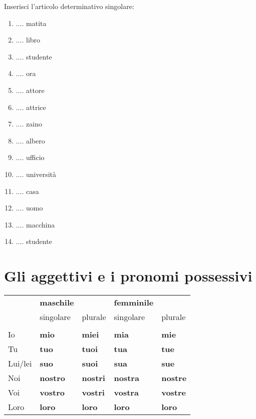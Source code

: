 \documentclass[letter,11pt]{article}
\newcommand{\myCode}[1]{\colorbox{gray!30}{#1}}
\begin{document}
\vskip 0.5in
\myCode{Inserisci l'articolo determinativo singolare: }

\begin{multicols}{2}
\begin{enumerate}
    \item .... matita
    \item .... libro
    \item .... studente
    \item .... ora
    \item .... attore
    \item .... attrice
    \item .... zaino
    \item .... albero
    \item .... ufficio
    \item .... università
    \item .... casa
    \item .... uomo
    \item .... macchina
    \item .... studente
\end{enumerate}
\end{multicols}

\vskip 0.5in
\section*{Gli aggettivi e i pronomi possessivi}

\vskip 0.2in

\begin{tabular}{ |p{3cm}| p{2cm}| p{2cm}| p{2cm}| p{2cm}| }
    & {\bf maschile} & & {\bf femminile} &  \\
    & singolare & plurale & singolare & plurale  \\
    \hline
    \hline
    & & & & \\ \hline
    Io   &  {\bf mio} & {\bf miei} & {\bf mia} & {\bf mie}  \\ \hline
    Tu   &  {\bf tuo} & {\bf tuoi} & {\bf tua} & {\bf tue}  \\ \hline
    Lui/lei &  {\bf suo} & {\bf suoi} & {\bf sua} & {\bf sue}  \\ \hline
    Noi  &  {\bf nostro} & {\bf nostri} & {\bf nostra} & {\bf nostre}  \\ \hline
    Voi  &  {\bf vostro} & {\bf vostri} & {\bf vostra} & {\bf vostre}  \\ \hline
    Loro &  {\bf loro} & {\bf loro} & {\bf loro} & {\bf loro}  \\ \hline
    \hline

\end{tabular}
\end{document}
